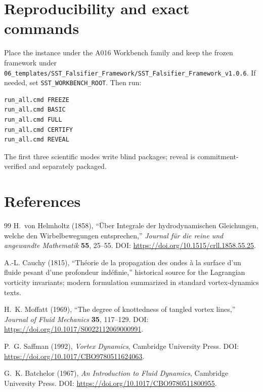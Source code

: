 \documentclass[11pt,a4paper]{article}
\begin{document}

\section{Reproducibility and exact commands}
Place the instance under the A016 Workbench family and keep the frozen framework under \texttt{06\_templates/SST\_Falsifier\_Framework/SST\_Falsifier\_Framework\_v1.0.6}. If needed, set \texttt{SST\_WORKBENCH\_ROOT}. Then run:
\begin{verbatim}
run_all.cmd FREEZE
run_all.cmd BASIC
run_all.cmd FULL
run_all.cmd CERTIFY
run_all.cmd REVEAL
\end{verbatim}
The first three scientific modes write blind packages; reveal is commitment-verified and separately packaged.

\section{References}
\begin{thebibliography}{99}
H.~von Helmholtz (1858), ``\"Uber Integrale der hydrodynamischen Gleichungen, welche den Wirbelbewegungen entsprechen,'' \emph{Journal f\"ur die reine und angewandte Mathematik} \textbf{55}, 25--55. DOI: \url{https://doi.org/10.1515/crll.1858.55.25}.

A.-L. Cauchy (1815), ``Th\'eorie de la propagation des ondes \`a la surface d'un fluide pesant d'une profondeur ind\'efinie,'' historical source for the Lagrangian vorticity invariants; modern formulation summarized in standard vortex-dynamics texts.

H.~K. Moffatt (1969), ``The degree of knottedness of tangled vortex lines,'' \emph{Journal of Fluid Mechanics} \textbf{35}, 117--129. DOI: \url{https://doi.org/10.1017/S0022112069000991}.

P.~G. Saffman (1992), \emph{Vortex Dynamics}, Cambridge University Press. DOI: \url{https://doi.org/10.1017/CBO9780511624063}.

G.~K. Batchelor (1967), \emph{An Introduction to Fluid Dynamics}, Cambridge University Press. DOI: \url{https://doi.org/10.1017/CBO9780511800955}.
\end{thebibliography}
\end{document}
